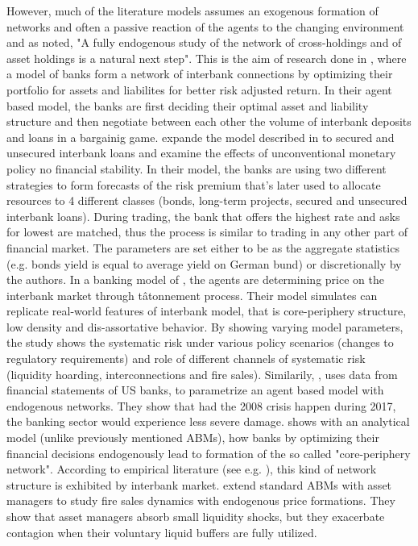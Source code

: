 \documentclass{article}
\begin{document}
However, much of the literature models assumes an exogenous formation of networks and often a passive reaction of the agents to the changing environment and as \citet{elliot} noted, "A fully endogenous study
of the network of cross-holdings and of asset holdings is a natural next step". This is the aim of research done in \cite{halaj}, where a model of banks form a network of interbank connections by optimizing their portfolio for assets and liabilites for better risk adjusted return. In their agent based model, the banks are first deciding their optimal asset and liability structure and then negotiate between each other the volume of interbank deposits and loans in a bargainig game. \citet{wolski} expande the model described in \citet{halaj} to secured and unsecured interbank loans and examine the effects of unconventional monetary policy no financial stability. In their model, the banks are using two different strategies to form forecasts of the risk premium that's later used to allocate resources to 4 different classes (bonds, long-term projects, secured and unsecured interbank loans). During trading, the bank that offers the highest rate and asks for lowest are matched, thus the process is similar to trading in any other part of financial market. The parameters are set either to be as the aggregate statistics (e.g. bonds yield is equal to average yield on German bund) or discretionally by the authors. In a banking model of \citet{aldasoro}, the agents are determining price on the interbank market through tâtonnement process. Their model simulates can replicate real-world features of interbank model, that is core-periphery structure, low density and dis-assortative behavior. By showing varying model parameters, the study shows the systematic risk under various policy scenarios (changes to regulatory requirements) and role of different channels of systematic risk (liquidity hoarding, interconnections and fire sales). Similarily, \citet{liu}, uses data from financial statements of US banks, to parametrize an agent based model with endogenous networks. They show that had the 2008 crisis happen during 2017, the banking sector would experience less severe damage. \citet{NBERw29467} shows with an analytical model (unlike previously mentioned ABMs), how banks by optimizing their financial decisions endogenously lead to formation of the so called "core-periphery network". According to empirical literature (see e.g. \citet{intveld}), this kind of network structure is exhibited by interbank market. \citet{calimani} extend standard ABMs with asset managers to study fire sales dynamics with endogenous price formations. They show that asset managers absorb small liquidity shocks, but they exacerbate contagion when their voluntary liquid buffers are fully utilized.
\end{document}
